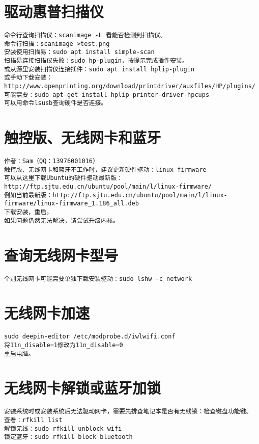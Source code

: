 \documentclass[a4paper,fontset=fandol,zihao=-4,linespread=1.2,oneside]{ctexbook}
\begin{document}
\section{驱动惠普扫描仪}
\begin{lstlisting}
命令行查询扫描仪：scanimage -L 看能否检测到扫描仪。
命令行扫描：scanimage >test.png
安装使用扫描易：sudo apt install simple-scan
扫描易连接扫描仪失败：sudo hp-plugin，按提示完成插件安装。
或从源里安装扫描仪连接插件：sudo apt install hplip-plugin
或手动下载安装：http://www.openprinting.org/download/printdriver/auxfiles/HP/plugins/
可能需要：sudo apt-get install hplip printer-driver-hpcups
可以用命令lsusb查询硬件是否连接。
\end{lstlisting}

\section{触控版、无线网卡和蓝牙}
\begin{lstlisting}
作者：Sam（QQ：13976001016）
触控版、无线网卡和蓝牙不工作时，建议更新硬件驱动：linux-firmware
可以从这里下载Ubuntu的硬件驱动最新版：http://ftp.sjtu.edu.cn/ubuntu/pool/main/l/linux-firmware/
例如当前最新版：http://ftp.sjtu.edu.cn/ubuntu/pool/main/l/linux-firmware/linux-firmware_1.186_all.deb
下载安装，重启。
如果问题仍然无法解决，请尝试升级内核。
\end{lstlisting}

\section{查询无线网卡型号}
\begin{lstlisting}
个别无线网卡可能需要单独下载安装驱动：sudo lshw -c network
\end{lstlisting}

\section{无线网卡加速}
\begin{lstlisting}
sudo deepin-editor /etc/modprobe.d/iwlwifi.conf
将11n_disable=1修改为11n_disable=0
重启电脑。
\end{lstlisting}

\section{无线网卡解锁或蓝牙加锁}
\begin{lstlisting}
安装系统时或安装系统后无法驱动网卡，需要先排查笔记本是否有无线锁：检查键盘功能键。
查看：rfkill list
解锁无线：sudo rfkill unblock wifi
锁定蓝牙：sudo rfkill block bluetooth
\end{lstlisting}
\end{document}
